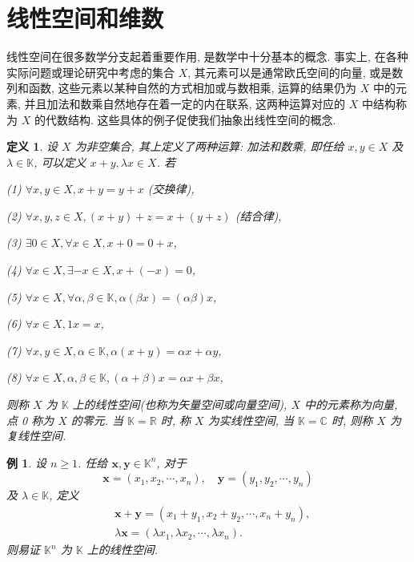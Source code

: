 \documentclass[openany]{ctexbook}
\theoremstyle{kaiti}
\newtheorem{definition}{定义}[section]
\theoremstyle{normal}
\newtheorem{example}{例}[section]
\begin{document}
\section{线性空间和维数}

线性空间在很多数学分支起着重要作用, 是数学中十分基本的概念. 事实上, 在各种实际问题或理论研究中考虑的集合 $X$, 其元素可以是通常欧氏空间的向量, 或是数列和函数, 这些元素以某种自然的方式相加或与数相乘, 运算的结果仍为 $X$ 中的元素, 并且加法和数乘自然地存在着一定的内在联系, 这两种运算对应的 $X$ 中结构称为 $X$ 的代数结构. 这些具体的例子促使我们抽象出线性空间的概念.

\begin{definition}
设 $X$ 为非空集合, 其上定义了两种运算: 加法和数乘, 即任给 $x, y \in X$ 及 $\lambda \in \mathbb{K}$, 可以定义 $x+y, \lambda x \in X$. 若

(1) $\forall x, y \in X, x+y=y+x$ (交换律),

(2) $\forall x, y, z \in X,(x+y)+z=x+(y+z)$ (结合律),

(3) $\exists 0 \in X, \forall x \in X, x+0=0+x$,

(4) $\forall x \in X, \exists-x \in X, x+(-x)=0$,

(5) $\forall x \in X, \forall \alpha, \beta \in \mathbb{K}, \alpha(\beta x)=(\alpha \beta) x$,

(6) $\forall x \in X, 1 x=x$,

(7) $\forall x, y \in X, \alpha \in \mathbb{K}, \alpha(x+y)=\alpha x+\alpha y$,

(8) $\forall x \in X, \alpha, \beta \in \mathbb{K},(\alpha+\beta) x=\alpha x+\beta x$,

则称 $X$ 为 $\mathbb{K}$ 上的线性空间(也称为矢量空间或向量空间), $X$ 中的元素称为向量, 点 0 称为 $X$ 的零元. 当 $\mathbb{K}=\mathbb{R}$ 时, 称 $X$ 为实线性空间, 当 $\mathbb{K}=\mathbb{C}$ 时, 则称 $X$ 为复线性空间.
\end{definition}

\begin{example}
设 $n \geqslant 1$. 任给 $\boldsymbol{x}, \boldsymbol{y} \in \mathbb{K}^n$, 对于
$$
\boldsymbol{x}=\left(x_1, x_2, \cdots, x_n\right), \quad \boldsymbol{y}=\left(y_1, y_2, \cdots, y_n\right)
$$
及 $\lambda \in \mathbb{K}$, 定义
$$
\begin{aligned}
&\boldsymbol{x}+\boldsymbol{y}=\left(x_1+y_1, x_2+y_2, \cdots, x_n+y_n\right), \\
&\lambda \boldsymbol{x}=\left(\lambda x_1, \lambda x_2, \cdots, \lambda x_n\right).
\end{aligned}
$$
则易证 $\mathbb{K}^n$ 为 $\mathbb{K}$ 上的线性空间.
\end{example}
\end{document}
